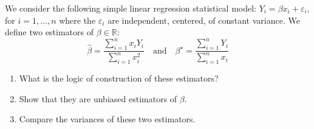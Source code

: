 \begin{exercise}
We consider the following simple linear regression statistical model: \(Y_i = \beta x_i + \varepsilon_i\), for \(i = 1, \ldots, n\) where the \(\varepsilon_i\) are independent, centered, of constant variance. We define two estimators of \(\beta \in \mathbb{R}\):
\[\hat{\beta} = \frac{\sum_{i=1}^n x_i Y_i}{\sum_{i=1}^n x_i^2} \quad \text{and} \quad \beta^{\star} = \frac{\sum_{i=1}^n Y_i}{\sum_{i=1}^n x_i}\]

\begin{enumerate}
    \item What is the logic of construction of these estimators?
    \item Show that they are unbiased estimators of \(\beta\).
    \item Compare the variances of these two estimators.
\end{enumerate}
\end{exercise}

